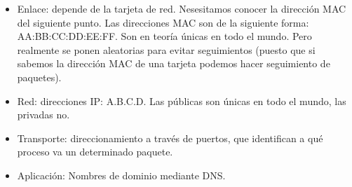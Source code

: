 \begin{itemize}
    \item Enlace: depende de la tarjeta de red. Nesesitamos conocer la dirección MAC del siguiente punto. Las direcciones MAC son de la siguiente forma: AA\@:BB\@:CC\@:DD\@:EE\@:FF\@. Son en teoría únicas en todo el mundo. Pero realmente se ponen aleatorias para evitar seguimientos (puesto que si sabemos la dirección MAC de una tarjeta podemos hacer seguimiento de paquetes). 
    \item Red: direcciones IP\@: A\@.B\@.C\@.D\@. Las públicas son únicas en todo el mundo, las privadas no. 
    \item Transporte: direccionamiento a través de puertos, que identifican a qué proceso va un determinado paquete. 
    \item Aplicación: Nombres de dominio mediante DNS\@. 
\end{itemize}

